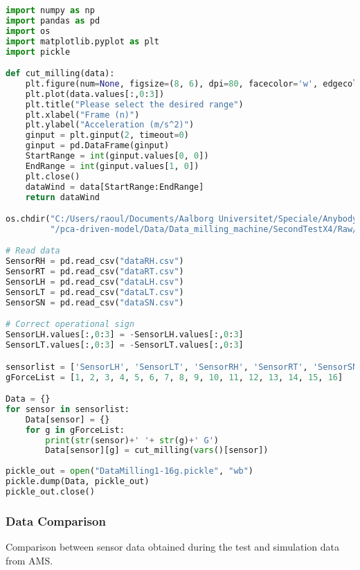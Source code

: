 \begin{lstlisting}[language=Python]
import numpy as np
import pandas as pd
import os
import matplotlib.pyplot as plt
import pickle

def cut_milling(data):
    plt.figure(num=None, figsize=(8, 6), dpi=80, facecolor='w', edgecolor='k' )
    plt.plot(data.values[:,0:3])
    plt.title("Please select the desired range")
    plt.xlabel("Frame (n)")
    plt.ylabel("Acceleration (m/s^2)") 
    ginput = plt.ginput(2, timeout=0)
    ginput = pd.DataFrame(ginput)
    StartRange = int(ginput.values[0, 0])
    EndRange = int(ginput.values[1, 0])
    plt.close()
    dataWind = data[StartRange:EndRange]
    return dataWind

os.chdir("C:/Users/raoul/Documents/Aalborg Universitet/Speciale/AnybodyPolar"
         "/pca-driven-model/Data/Data_milling_machine/SecondTestX4/Raw/")

# Read data
SensorRH = pd.read_csv("dataRH.csv")
SensorRT = pd.read_csv("dataRT.csv")
SensorLH = pd.read_csv("dataLH.csv")
SensorLT = pd.read_csv("dataLT.csv")
SensorSN = pd.read_csv("dataSN.csv")

# Correct operational sign
SensorLH.values[:,0:3] = -SensorLH.values[:,0:3]
SensorLT.values[:,0:3] = -SensorLT.values[:,0:3]

sensorlist = ['SensorLH', 'SensorLT', 'SensorRH', 'SensorRT', 'SensorSN']
gForceList = [1, 2, 3, 4, 5, 6, 7, 8, 9, 10, 11, 12, 13, 14, 15, 16]

Data = {}
for sensor in sensorlist:
    Data[sensor] = {}
    for g in gForceList:
        print(str(sensor)+' '+ str(g)+' G')
        Data[sensor][g] = cut_milling(vars()[sensor])
        
pickle_out = open("DataMilling1-16g.pickle", "wb")
pickle.dump(Data, pickle_out)
pickle_out.close()
\end{lstlisting}
\clearpage

\subsubsection{Data Comparison}
Comparison between sensor data obtained during the test and simulation data from AMS.

